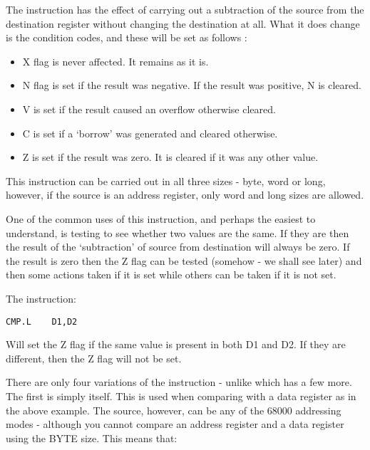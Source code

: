 The  instruction has the effect of carrying out a subtraction of
    the source from the destination register without changing the destination at all. What it does change is the condition codes, and these will be set as follows
   :
\begin{itemize}[itemsep=0pt]

\item{}X flag is never affected. It remains as it is.


\item{}N flag is set if the result was negative. If the result was
        positive, N is cleared.


\item{}V is set if the result caused an overflow otherwise
        cleared.


\item{}C is set if a `borrow' was generated and cleared
        otherwise.


\item{}Z is set if the result was zero. It is cleared if it was any
        other value.

\end{itemize}

This instruction can be carried out in all three sizes -{} byte, word
    or long, however, if the source is an address register, only word and long sizes are allowed.

One of the common uses of this instruction, and perhaps the easiest
    to understand, is testing to see whether two values are the same. If they
    are then the result of the `subtraction' of source from destination will
    always be zero. If the result is zero then the Z flag can be tested
    (somehow -{} we shall see later) and then some actions taken if it is set
    while others can be taken if it is not set.

The instruction:

\begin{lstlisting}[firstnumber=1,]
          CMP.L    D1,D2
\end{lstlisting}

Will set the Z flag if the same value is present in both D1 and D2.
    If they are different, then the Z flag will not be set.

There are only four variations of the  instruction -{} unlike 
    which has a few more. The first is simply  itself. This is used when
    comparing with a data register as in the above example. The source,
    however, can be any of the 68000 addressing modes -{} although you cannot
    compare an address register and a data register using the BYTE size. This
    means that:

